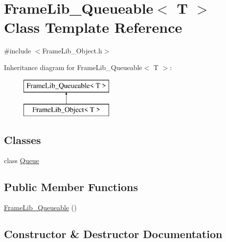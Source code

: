 \hypertarget{class_frame_lib___queueable}{}\section{Frame\+Lib\+\_\+\+Queueable$<$ T $>$ Class Template Reference}
\label{class_frame_lib___queueable}


{\ttfamily \#include $<$Frame\+Lib\+\_\+\+Object.\+h$>$}

Inheritance diagram for Frame\+Lib\+\_\+\+Queueable$<$ T $>$\+:\begin{figure}[H]
\begin{center}
\leavevmode
\includegraphics[height=2.000000cm]{class_frame_lib___queueable}
\end{center}
\end{figure}
\subsection*{Classes}
\begin{DoxyCompactItemize}
\item 
class \hyperlink{class_frame_lib___queueable_1_1_queue}{Queue}
\end{DoxyCompactItemize}
\subsection*{Public Member Functions}
\begin{DoxyCompactItemize}
\item 
\hyperlink{class_frame_lib___queueable_ae851e341082e42b5d9f35fce31f51870}{Frame\+Lib\+\_\+\+Queueable} ()
\end{DoxyCompactItemize}


\subsection{Constructor \& Destructor Documentation}
\mbox{\label{class_frame_lib___queueable_ae851e341082e42b5d9f35fce31f51870}} 
